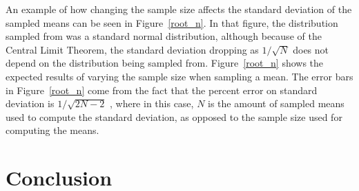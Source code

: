 \documentclass[11pt,letterpaper]{article}
\begin{document}
An example of how changing the sample size affects the standard deviation of the
sampled means can be seen in Figure~\ref{root_n}. In that figure, the
distribution sampled from was a standard normal distribution, although because
of the Central Limit Theorem, the standard deviation dropping as $1 / \sqrt{N}$
does not depend on the distribution being sampled from. Figure~\ref{root_n}
shows the expected results of varying the sample size when sampling a mean. The
error bars in Figure~\ref{root_n} come from the fact that the percent error on
standard deviation is $1 / \sqrt{2N - 2}$ \cite{ErrorBook}, where in this case,
$N$ is the amount of sampled means used to compute the standard deviation, as
opposed to the sample size used for computing the means.

%
% 

\section{Conclusion}
\end{document}

